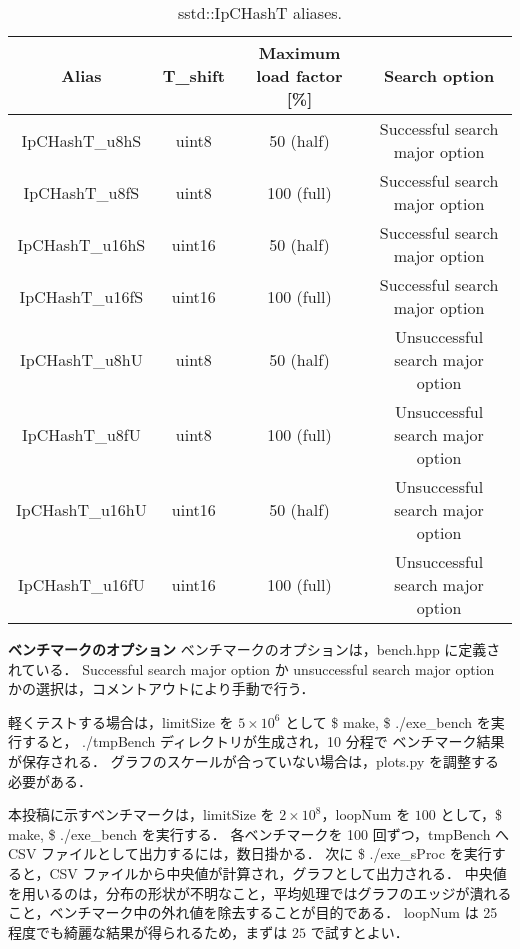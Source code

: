 \begin{table}[h]
  \begin{center}
    \fontsize{9pt}{10pt}\selectfont
    \caption{sstd::IpCHashT aliases.}
    \begin{tabular}{c|ccc} \hline
      Alias           & T\_shift & Maximum load factor [\%] \rule[0pt]{0pt}{10pt} & Search option \\ \hline
      IpCHashT\_u8hS  & uint8    &  50 (half)                                     &   Successful search major option \rule[0pt]{0pt}{10pt} \\
      IpCHashT\_u8fS  & uint8    & 100 (full)                                     &   Successful search major option \rule[0pt]{0pt}{10pt} \\
      IpCHashT\_u16hS & uint16   &  50 (half)                                     &   Successful search major option \rule[0pt]{0pt}{10pt} \\
      IpCHashT\_u16fS & uint16   & 100 (full)                                     &   Successful search major option \rule[0pt]{0pt}{10pt} \\
      IpCHashT\_u8hU  & uint8    &  50 (half)                                     & Unsuccessful search major option \rule[0pt]{0pt}{10pt} \\
      IpCHashT\_u8fU  & uint8    & 100 (full)                                     & Unsuccessful search major option \rule[0pt]{0pt}{10pt} \\
      IpCHashT\_u16hU & uint16   &  50 (half)                                     & Unsuccessful search major option \rule[0pt]{0pt}{10pt} \\
      IpCHashT\_u16fU & uint16   & 100 (full)                                     & Unsuccessful search major option \rule[0pt]{0pt}{10pt} \\ \hline
    \end{tabular}
    \label{table_alias}
  \end{center}
\end{table}

{\bf ベンチマークのオプション}
\samepage\newline\indent
ベンチマークのオプションは，bench.hpp に定義されている．
Successful search major option か unsuccessful search major option かの選択は，コメントアウトにより手動で行う．

軽くテストする場合は，limitSize を $5\times 10^6$ として \$ make, \$ ./exe\_bench を実行すると，
./tmpBench ディレクトリが生成され，10 分程で ベンチマーク結果が保存される．
グラフのスケールが合っていない場合は，plots.py を調整する必要がある．

本投稿に示すベンチマークは，limitSize を $2\times10^8$，loopNum を $100$ として，\$ make, \$ ./exe\_bench を実行する．
各ベンチマークを 100 回ずつ，tmpBench へ CSV ファイルとして出力するには，数日掛かる．
次に \$ ./exe\_sProc を実行すると，CSV ファイルから中央値が計算され，グラフとして出力される．
中央値を用いるのは，分布の形状が不明なこと，平均処理ではグラフのエッジが潰れること，ベンチマーク中の外れ値を除去することが目的である．
loopNum は 25 程度でも綺麗な結果が得られるため，まずは $25$ で試すとよい．


